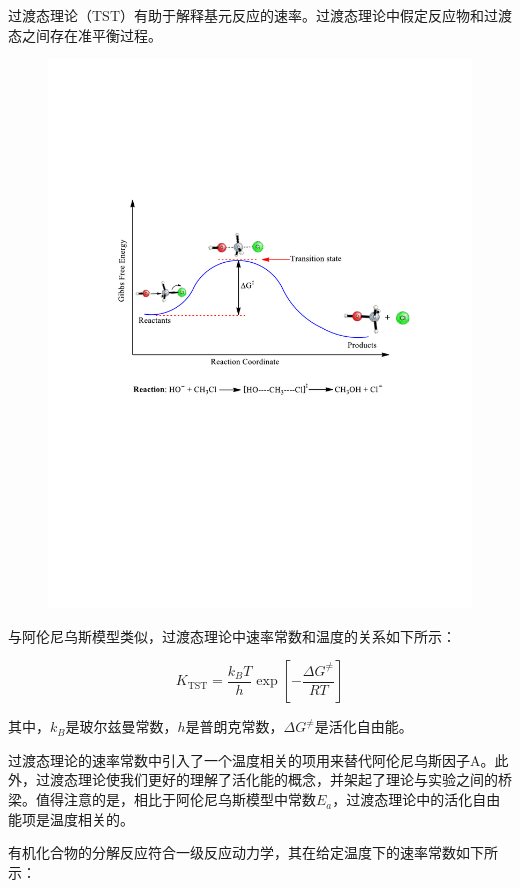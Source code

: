 过渡态理论（TST）有助于解释基元反应的速率。过渡态理论中假定反应物和过渡态之间存在准平衡过程。

\begin{figure}[h]
	\centering
	\includegraphics[width=15cm]{./pic/t21-1.pdf}
\end{figure}

与阿伦尼乌斯模型类似，过渡态理论中速率常数和温度的关系如下所示：

$$K_{\mathrm{TST}} = \frac{k_BT}{h} \exp\left[- \frac{\Delta G^{\neq}}{RT}\right]$$

其中，\(k_B\)是玻尔兹曼常数，\(h\)是普朗克常数，\(\Delta G^{\neq}\)是活化自由能。

过渡态理论的速率常数中引入了一个温度相关的项用来替代阿伦尼乌斯因子A。此外，过渡态理论使我们更好的理解了活化能的概念，并架起了理论与实验之间的桥梁。值得注意的是，相比于阿伦尼乌斯模型中常数\(E_a\)，过渡态理论中的活化自由能项是温度相关的。

有机化合物的分解反应符合一级反应动力学，其在给定温度下的速率常数如下所示：

